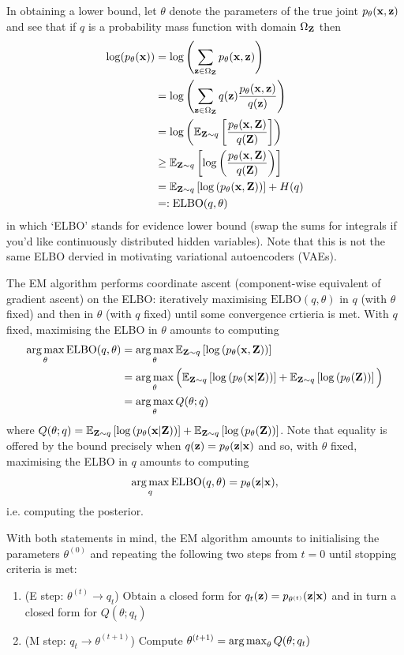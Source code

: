 \documentclass[11pt]{article}
\begin{document}
\begin{appendices}
In obtaining a lower bound, let $\theta$ denote the parameters of the true joint $p_{\theta}(\mathbf{x},\mathbf{z})$ and see that if $q$ is a probability mass function with domain $\Omega_{\mathbf{Z}}$ then
\begin{align*}
    \log(p_{\theta}(\mathbf{x}))
    &=
    \log\left(\sum_{\mathbf{z}\in\Omega_{\mathbf{Z}}}p_{\theta}(\mathbf{x},\mathbf{z})\right)\\
    &=
    \log\left(\sum_{\mathbf{z}\in\Omega_{\mathbf{Z}}}q(\mathbf{z})\frac{p_{\theta}(\mathbf{x},\mathbf{z})}{q(\mathbf{z})}\right)\\
    &=
    \log\left(\mathbb{E}_{\mathbf{Z}\sim q}\left[\frac{p_{\theta}(\mathbf{x},\mathbf{Z})}{q(\mathbf{Z})}\right]\right)\\
    &\geq
    \mathbb{E}_{\mathbf{Z}\sim q}\left[\log\left(\frac{p_{\theta}(\mathbf{x},\mathbf{Z})}{q(\mathbf{Z})}\right)\right]\\
    &=
    \mathbb{E}_{\mathbf{Z}\sim q}\left[\log\left(p_{\theta}(\mathbf{x},\mathbf{Z})\right)\right]+H(q)\\
    &=:
    \text{ELBO}(q,\theta)
\end{align*}
in which `ELBO' stands for evidence lower bound (swap the sums for integrals if you'd like continuously distributed hidden variables). Note that this is not the same ELBO dervied in motivating variational autoencoders (VAEs).

The EM algorithm performs coordinate ascent (component-wise equivalent of gradient ascent) on the ELBO: iteratively maximising $\text{ELBO}(q,\theta)$ in $q$ (with $\theta$ fixed) and then in $\theta$ (with $q$ fixed) until some convergence crtieria is met. With $q$ fixed, maximising the ELBO in $\theta$ amounts to computing
\begin{align*}
    \operatorname*{arg\,max}_{\theta}\text{ELBO}(q,\theta)
    &=
    \operatorname*{arg\,max}_{\theta}\mathbb{E}_{\mathbf{Z}\sim q}\left[\log\left(p_{\theta}(\mathbf{x},\mathbf{Z})\right)\right]\\
    &=
    \operatorname*{arg\,max}_{\theta}\Big(\mathbb{E}_{\mathbf{Z}\sim q}\left[\log\left(p_{\theta}(\mathbf{x}|\mathbf{Z})\right)\right]+\mathbb{E}_{\mathbf{Z}\sim q}\left[\log\left(p_{\theta}(\mathbf{Z})\right)\right]\Big)\\
    &=
    \operatorname*{arg\,max}_{\theta}Q(\theta;q)
\end{align*}
where $Q(\theta;q)=\mathbb{E}_{\mathbf{Z}\sim q}\left[\log\left(p_{\theta}(\mathbf{x}|\mathbf{Z})\right)\right]+\mathbb{E}_{\mathbf{Z}\sim q}\left[\log\left(p_{\theta}(\mathbf{Z})\right)\right]$. Note that equality is offered by the bound precisely when $q(\mathbf{z})=p_{\theta}(\mathbf{z}|\mathbf{x})$ and so, with $\theta$ fixed, maximising the ELBO in $q$ amounts to computing
$$
\operatorname*{arg\,max}_{q}\text{ELBO}(q,\theta)
=
p_{\theta}(\mathbf{z}|\mathbf{x}),
$$
i.e. computing the posterior.

With both statements in mind, the EM algorithm amounts to initialising the parameters $\theta^{(0)}$ and repeating the following two steps from $t=0$ until stopping criteria is met:
\begin{enumerate}
    \item (E step: $\theta^{(t)}\to q_t$) Obtain a closed form for $q_t(\mathbf{z})=p_{\theta^{(t)}}(\mathbf{z}|\mathbf{x})$ and in turn a closed form for $Q(\theta;q_t)$
    \item (M step: $q_t\to\theta^{(t+1)}$) Compute $\theta^{(t+1)}=\operatorname*{arg\,max}_{\theta}Q(\theta;q_t)$
\end{enumerate}


\end{appendices}
\end{document}
